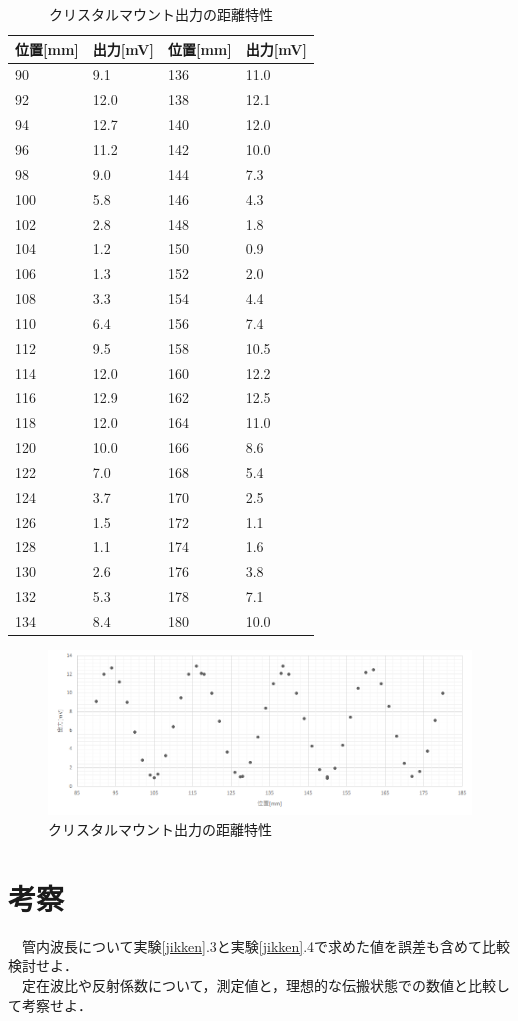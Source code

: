 \newpage
\begin{table}[]
  \centering
  \caption{クリスタルマウント出力の距離特性}
  \begin{tabular}{|l|l||l|l|}
  \hline
  位置{[}mm{]} & 出力{[}mV{]} & 位置{[}mm{]} & 出力{[}mV{]} \\ \hline
  90& 9.1& 136& 11.0\\ \hline
  92& 12.0& 138& 12.1\\ \hline
  94& 12.7& 140& 12.0\\ \hline
  96& 11.2& 142& 10.0\\ \hline
  98& 9.0& 144& 7.3\\ \hline
  100& 5.8& 146& 4.3\\ \hline
  102& 2.8& 148& 1.8\\ \hline
  104& 1.2& 150& 0.9\\ \hline
  106& 1.3& 152& 2.0\\ \hline
  108& 3.3& 154& 4.4\\ \hline
  110& 6.4& 156& 7.4\\ \hline
  112& 9.5& 158& 10.5\\ \hline
  114& 12.0& 160& 12.2\\ \hline
  116& 12.9& 162& 12.5\\ \hline
  118& 12.0& 164& 11.0\\ \hline
  120& 10.0& 166& 8.6\\ \hline
  122& 7.0& 168& 5.4\\ \hline
  124& 3.7& 170& 2.5\\ \hline
  126& 1.5& 172& 1.1\\ \hline
  128& 1.1& 174& 1.6\\ \hline
  130& 2.6& 176& 3.8\\ \hline
  132& 5.3& 178& 7.1\\ \hline
  134& 8.4& 180& 10.0\\ \hline
  \end{tabular}
\end{table}

\newpage
\begin{landscape}
  \begin{figure}
    \centering
    \includegraphics[width=25cm]{./data/data.png}
    \caption{クリスタルマウント出力の距離特性}
  \end{figure}
\end{landscape}

\newpage
\section{考察}
　管内波長について実験\ref{jikken}.3と実験\ref{jikken}.4で求めた値を誤差も含めて比較検討せよ．\\

　定在波比や反射係数について，測定値と，理想的な伝搬状態での数値と比較して考察せよ．\\


